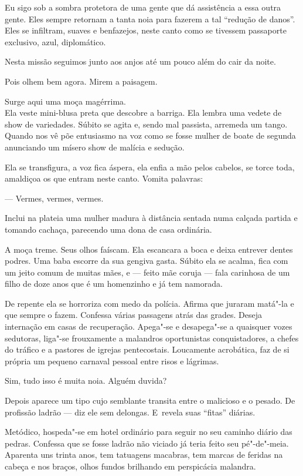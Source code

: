 Eu sigo sob a sombra protetora de uma gente que dá assistência a essa
outra gente. Eles sempre retornam a tanta noia para fazerem a tal
``redução de danos''. Eles se infiltram, suaves e benfazejos, neste
canto como se tivessem passaporte exclusivo, azul, diplomático.

Nesta missão seguimos junto aos anjos até um pouco além do cair da
noite.

\asterisc{}

Pois olhem bem agora. Mirem a paisagem.

Surge aqui uma moça magérrima.\\ Ela veste mini-blusa preta que descobre
a barriga. Ela lembra uma vedete de show de variedades. Súbito se agita
e, sendo mal passista, arremeda um tango. Quando nos vê põe entusiasmo
na voz como se fosse mulher de boate de segunda anunciando um mísero
show de malícia e sedução.

Ela se transfigura, a voz fica áspera, ela enfia a mão pelos cabelos, se
torce toda, amaldiçoa os que entram neste canto. Vomita palavras:

— Vermes, vermes, vermes.

Inclui na plateia uma mulher madura à distância sentada numa calçada
partida e tomando cachaça, parecendo uma dona de casa ordinária.

A moça treme. Seus olhos faíscam. Ela escancara a boca e deixa entrever
dentes podres. Uma baba escorre da sua gengiva gasta. Súbito ela se
acalma, fica com um jeito comum de muitas mães, e --- feito mãe coruja
--- fala carinhosa de um filho de doze anos que é um homenzinho e já tem
namorada.

De repente ela se horroriza com medo da polícia. Afirma que juraram
matá"-la e que sempre o fazem. Confessa várias passagens atrás das
grades. Deseja internação em casas de recuperação. Apega"-se e
desapega"-se a quaisquer vozes sedutoras, liga"-se frouxamente a malandros
oportunistas conquistadores, a chefes do tráfico e a pastores de igrejas
pentecostais. Loucamente acrobática, faz de si própria um pequeno
carnaval pessoal entre risos e lágrimas.

Sim, tudo isso é muita noia. Alguém duvida?

\asterisc{}

Depois aparece um tipo cujo semblante transita entre o malicioso e o
pesado. De profissão ladrão --- diz ele sem delongas. E~revela suas
``fitas'' diárias.

Metódico, hospeda"-se em hotel ordinário para seguir no seu caminho
diário das pedras. Confessa que se fosse ladrão não viciado já teria
feito seu pé"-de"-meia. Aparenta uns trinta anos, tem tatuagens macabras,
tem marcas de feridas na cabeça e nos braços, olhos fundos brilhando em
perspicácia malandra.

